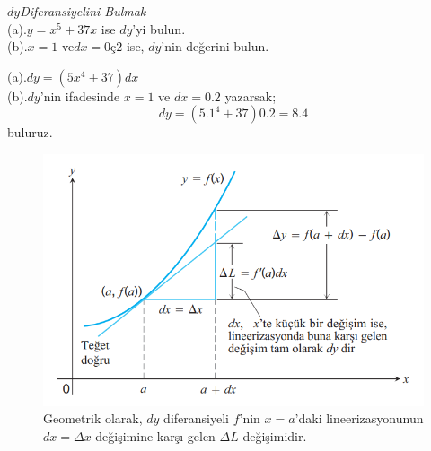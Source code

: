\begin{ornek}$dy$\textit{Diferansiyelini Bulmak}\\
(a).$y=x^5+37x$ ise $dy$'yi bulun.\\
(b).$x=1$ ve$dx=0ç2$ ise, $dy$'nin değerini bulun.
\end{ornek}
\begin{cozum}
(a).$dy=(5x^4+37)dx$\\
(b).$dy$'nin ifadesinde $x=1$ ve $dx=0.2$ yazarsak;
	\begin{equation*}
	dy=(5.1^4+37)0.2=8.4
	\end{equation*}
buluruz.\\
\end{cozum}
\begin{figure}[H]
	\centering
	\includegraphics[width=0.7\linewidth]{diferansiyeller1.png}
	\caption{Geometrik olarak, $dy$ diferansiyeli $f$'nin $x=a$'daki lineerizasyonunun $dx=\varDelta x$ değişimine karşı gelen $\varDelta L$ değişimidir.}
	\label{fig:ornekresim}
\end{figure}

